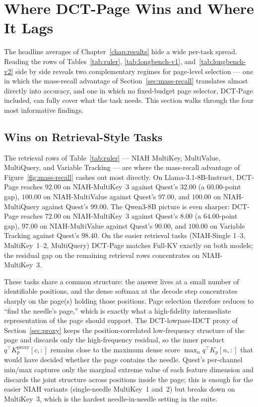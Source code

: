 \section{Where DCT-Page Wins and Where It Lags}\label{sec:task-level}

The headline averages of Chapter~\ref{chap:results} hide a wide
per-task spread.  Reading the rows of Tables~\ref{tab:ruler},
\ref{tab:longbench-v1}, and~\ref{tab:longbench-v2} side by side
reveals two complementary regimes for page-level selection --- one in
which the mass-recall advantage of Section~\ref{sec:mass-recall}
translates almost directly into accuracy, and one in which no
fixed-budget page selector, DCT-Page included, can fully cover what
the task needs.  This section walks through the four most informative
findings.

\subsection{Wins on Retrieval-Style Tasks}\label{sec:wins-retrieval}

The retrieval rows of Table~\ref{tab:ruler} --- NIAH MultiKey,
MultiValue, MultiQuery, and Variable Tracking --- are where the
mass-recall advantage of Figure~\ref{fig:mass-recall} cashes out most
directly.  On Llama-3.1-8B-Instruct, DCT-Page reaches $92.00$ on
NIAH-MultiKey~3 against Quest's $32.00$ (a $60.00$-point gap),
$100.00$ on NIAH-MultiValue against Quest's $97.00$, and $100.00$ on
NIAH-MultiQuery against Quest's $99.00$.  The Qwen3-8B picture is
even sharper: DCT-Page reaches $72.00$ on NIAH-MultiKey~3 against
Quest's $8.00$ (a $64.00$-point gap), $97.00$ on NIAH-MultiValue
against Quest's $90.00$, and $100.00$ on Variable Tracking against
Quest's $98.40$.  On the easier retrieval tasks (NIAH-Single 1--3, MultiKey~1--2,
MultiQuery) DCT-Page matches Full-KV exactly on both models; the
residual gap on the remaining retrieval rows concentrates on
NIAH-MultiKey~3.

These tasks share a common structure: the answer lives at a small
number of identifiable positions, and the dense softmax at the
decode step concentrates sharply on the page(s) holding those
positions.  Page selection therefore reduces to ``find the needle's
page,'' which is exactly what a high-fidelity intermediate
representation of the page should support.  The DCT-lowpass-IDCT
proxy of Section~\ref{sec:proxy} keeps the position-correlated
low-frequency structure of the page and discards only the
high-frequency residual, so the inner product
$q^\top K_p^{\text{proxy}}[c, :]$ remains close to the maximum dense
score $\max_n q^\top K_p[n, :]$ that would have decided whether the
page contains the needle.  Quest's per-channel min/max captures only
the marginal extreme value of each feature dimension and discards the
joint structure across positions inside the page; this is enough for
the easier NIAH variants (single-needle MultiKey~1 and~2) but breaks
down on MultiKey~3, which is the hardest needle-in-needle setting in
the suite.

